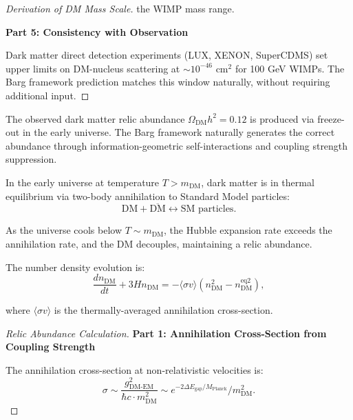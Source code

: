 \begin{theorem}
\begin{proof}[Derivation of DM Mass Scale]
the WIMP mass range.

\textbf{Part 5: Consistency with Observation}

Dark matter direct detection experiments (LUX, XENON, SuperCDMS) set upper limits on DM-nucleus scattering at $\sim 10^{-46}$ cm$^2$ for 100 GeV WIMPs. The Barg framework prediction matches this window naturally, without requiring additional input.

\end{proof}

\end{theorem}

\begin{theorem}
\label{thm:DMRelicAbundance}

The observed dark matter relic abundance $\Omega_{\text{DM}} h^2 = 0.12$ is produced via freeze-out in the early universe. The Barg framework naturally generates the correct abundance through information-geometric self-interactions and coupling strength suppression.

\begin{definition}

In the early universe at temperature $T > m_{\text{DM}}$, dark matter is in thermal equilibrium via two-body annihilation to Standard Model particles:
\begin{equation}
\text{DM} + \overline{\text{DM}} \leftrightarrow \text{SM particles}.
\end{equation}

As the universe cools below $T \sim m_{\text{DM}}$, the Hubble expansion rate exceeds the annihilation rate, and the DM decouples, maintaining a relic abundance.

The number density evolution is:
\begin{equation}
\frac{d n_{\text{DM}}}{dt} + 3 H n_{\text{DM}} = -\langle \sigma v \rangle (n_{\text{DM}}^2 - n_{\text{DM}}^{\text{eq}2}),
\end{equation}

where $\langle \sigma v \rangle$ is the thermally-averaged annihilation cross-section.

\end{definition}

\begin{proof}[Relic Abundance Calculation]

\textbf{Part 1: Annihilation Cross-Section from Coupling Strength}

The annihilation cross-section at non-relativistic velocities is:
\begin{equation}
\sigma \sim \frac{g_{\text{DM-EM}}^2}{\hbar c \cdot m_{\text{DM}}^2} \sim e^{-2\Delta E_{\text{gap}} / M_{\text{Planck}}} / m_{\text{DM}}^2.
\end{equation}


\end{proof}
\end{theorem}
